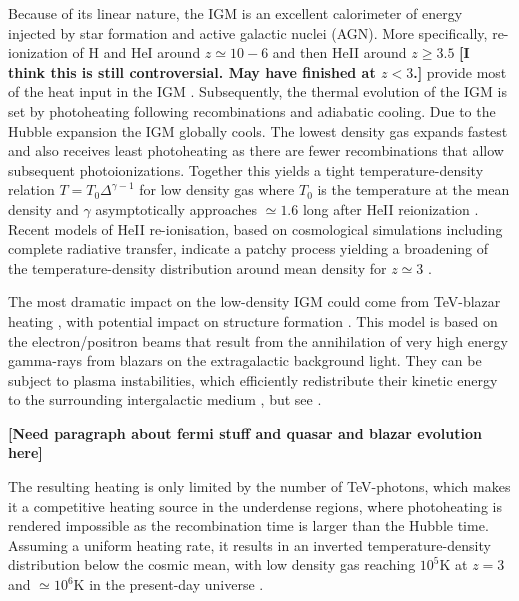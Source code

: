 \documentclass[numberedappendix]{emulateapj}
\newcommand\ALc[1]{{\color{red} \bf #1}} %
\newcommand\Ec[1]{{\color{magenta} \bf #1}} %
\begin{document}
Because of its linear nature, the IGM is an excellent calorimeter of energy injected by star formation and active galactic nuclei (AGN). More specifically, re-ionization of H and HeI around $z\simeq 10-6$ \citep{2006ARA&A..44..415F} and then HeII around $z\geqslant 3.5$ \Ec{[I think this is still controversial. May have finished at $z<3$.]} provide most of the heat input in the IGM \citep{2009ApJ...694..842M,2011ApJ...733L..24W}. Subsequently, the thermal evolution of the IGM is set by photoheating following recombinations and adiabatic cooling. Due to the Hubble expansion the IGM globally cools. The lowest density gas expands fastest and also receives least photoheating as there are fewer recombinations that allow subsequent photoionizations. Together this yields a tight temperature-density relation $T=T_0 \Delta ^{\gamma-1}$ for low density gas where $T_0$ is the temperature at the mean density and $\gamma$ asymptotically approaches $\simeq 1.6$  long after HeII reionization \citep{1997MNRAS.292...27H,2015MNRAS.450.4081P,2016MNRAS.456...47M}. Recent models of HeII re-ionisation, based on cosmological simulations including complete radiative transfer, indicate a patchy process yielding a broadening of the temperature-density distribution around mean density for $z\simeq 3$ \citep{2009ApJ...694..842M,2012MNRAS.423....7M,2013MNRAS.435.3169C}.

The most dramatic impact on the low-density IGM could come from TeV-blazar heating \citep{2012ApJ...752...23C,2012MNRAS.423..149P,2015ApJ...811...19L}, with potential impact on structure formation \citep{2012ApJ...752...24P}. This model is based on the electron/positron beams that result from the annihilation of very high energy gamma-rays from blazars on the extragalactic background light. They can be subject to plasma instabilities, which efficiently redistribute their kinetic energy to the surrounding intergalactic medium \citep{2012ApJ...752...22B,2013ApJ...777...49S,2012ApJ...758..102S,2014ApJ...797..110C,2016ApJ...833..118C},  but see \citet{2013ApJ...770...54M,2014ApJ...787...49S}.  

\ALc{[Need paragraph about fermi stuff and quasar and blazar evolution here]}

The resulting heating is only limited by the number of TeV-photons, which makes it a competitive heating source in the underdense regions, where photoheating is rendered impossible as the recombination time is larger than the Hubble time.  Assuming a uniform heating rate, it results in an inverted temperature-density distribution below the cosmic mean, with low density gas reaching  $10^5$K at $z=3$ and $\simeq 10^6$K in the present-day universe \citep{2012MNRAS.423..149P}.  
\end{document}
